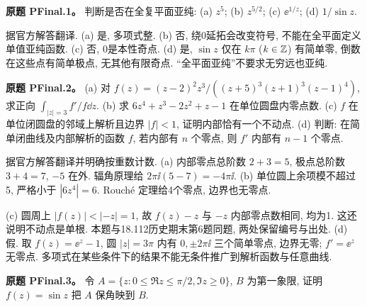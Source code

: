 \begin{exercise}\label{ass:pfinal-1}
\textbf{原题 PFinal.1。} 判断是否在全复平面亚纯: (a) $z^5$; (b) $z^{5/2}$; (c) $\ee^{1/z}$; (d) $1/\sin z$.
\end{exercise}
\begin{solution}据官方解答翻译. (a) 是, 多项式整. (b) 否, 绕0延拓会改变符号, 不能在全平面定义单值亚纯函数. (c) 否, 0是本性奇点. (d) 是, $\sin z$ 仅在 $k\pi$ ($k\in\mathbb Z$) 有简单零, 倒数在这些点有简单极点, 无其他有限奇点. “全平面亚纯”不要求无穷远也亚纯.\end{solution}
\begin{exercise}\label{ass:pfinal-2}
\textbf{原题 PFinal.2。} (a) 对 $f(z)=(z-2)^2z^3/((z+5)^3(z+1)^3(z-1)^4)$, 求正向 $\int_{|z|=3}f'/f\dd z$. (b) 求 $6z^4+z^3-2z^2+z-1$ 在单位圆盘内零点数. (c) $f$ 在单位闭圆盘的邻域上解析且边界 $|f|<1$, 证明内部恰有一个不动点. (d) 判断: 在简单闭曲线及内部解析的函数 $f$, 若内部有 $n$ 个零点, 则 $f'$ 内部有 $n-1$ 个零点.
\end{exercise}
\begin{solution}
据官方解答翻译并明确按重数计数. (a) 内部零点总阶数 $2+3=5$, 极点总阶数 $3+4=7$, $-5$ 在外. 辐角原理给 $2\pi\ii(5-7)=-4\pi\ii$. (b) 单位圆上余项模不超过5, 严格小于 $|6z^4|=6$. Rouché 定理给4个零点, 边界也无零点.

(c) 圆周上 $|f(z)|<|-z|=1$, 故 $f(z)-z$ 与 $-z$ 内部零点数相同, 均为1. 这还说明不动点是单根. 本题与18.112历史期末第6题同题, 两处保留编号与出处. (d) 假. 取 $f(z)=\ee^z-1$, 圆 $|z|=3\pi$ 内有 $0,\pm2\pi\ii$ 三个简单零点, 边界无零; $f'=\ee^z$ 无零点. 多项式在某些条件下的结果不能无条件推广到解析函数与任意曲线.
\end{solution}
\begin{exercise}\label{ass:pfinal-3}
\textbf{原题 PFinal.3。} 令 $A=\{z:0\le\Re z\le\pi/2,\Im z\ge0\}$, $B$ 为第一象限, 证明 $f(z)=\sin z$ 把 $A$ 保角映到 $B$.
\end{exercise}
